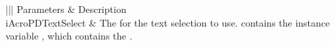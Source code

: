 \documentclass[letterpaper,12pt,english,openany,oneside]{sphinxmanual}
\begin{document}
\begin{savenotes}\sphinxattablestart
\centering
{}\label{\detokenize{IAC_API_OLE_Objects:section-33}}\nobreak
\begin{tabular}[t]{|||}
\hline
\sphinxstyletheadfamily 
Parameters
&\sphinxstyletheadfamily 
Description
\\
\hline
iAcroPDTextSelect
&
The  for the text selection to use.  contains the instance variable , which contains the .
\\
\hline
\end{tabular}
\par
\sphinxattableend\end{savenotes}
\end{document}
